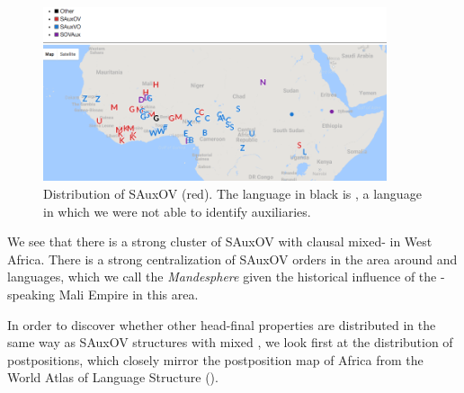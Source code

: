 \documentclass[output=paper,newtxmath,modfonts,nonflat,draftmode]{langsci/langscibook}
\begin{document}
\begin{figure}[p]
    \centering
    \includegraphics[width =0.9\textwidth]{figures/SAOV.png}
    \caption{Distribution of SAuxOV (red). The language in black is , a  language in which we were not able to identify auxiliaries.} \label{fig:sande:sauxov}
\end{figure}


We see that there is a strong cluster of SAuxOV with clausal mixed- in West Africa. There is a strong centralization of SAuxOV orders in the area around  and  languages, which we call the \textit{Mandesphere} given the historical influence of the -speaking Mali Empire in this area.


\newpage 
In order to discover whether other head-final properties are distributed in the same way as SAuxOV structures with mixed , we look first at the distribution of postpositions, which closely mirror the postposition map of Africa from the World Atlas of Language Structure \citep{wals-85} ().
\end{document}
